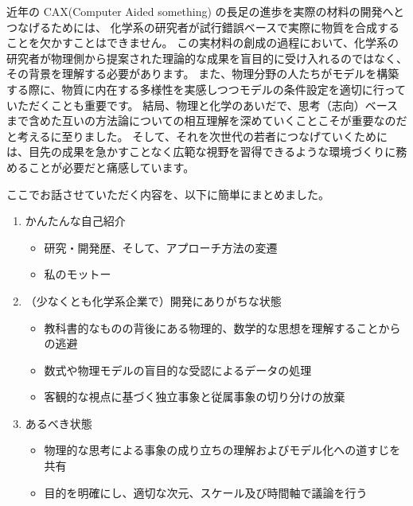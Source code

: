 \documentclass[uplatex,a4paper, 11pt]{jsarticle}
\begin{document}
近年の CAX(Computer Aided something) の長足の進歩を実際の材料の開発へとつなげるためには、
化学系の研究者が試行錯誤ベースで実際に物質を合成することを欠かすことはできません。
この実材料の創成の過程において、化学系の研究者が物理側から提案された理論的な成果を盲目的に受け入れるのではなく、
その背景を理解する必要があります。
また、物理分野の人たちがモデルを構築する際に、物質に内在する多様性を実感しつつモデルの条件設定を適切に行っていただくことも重要です。
結局、物理と化学のあいだで、思考（志向）ベースまで含めた互いの方法論についての相互理解を深めていくことこそが重要なのだと考えるに至りました。
そして、それを次世代の若者につなげていくためには、目先の成果を急かすことなく広範な視野を習得できるような環境づくりに務めることが必要だと痛感しています。
\vspace{3mm}
\begin{boxnote}
    \vspace{-1mm}
    ここでお話させていただく内容を、以下に簡単にまとめました。
    \vspace{-1mm}
\begin{enumerate}
    \item かんたんな自己紹介
    \begin{itemize}
        \item 研究・開発歴、そして、アプローチ方法の変遷
        \item 私のモットー
    \end{itemize}
    \item （少なくとも化学系企業で）開発にありがちな状態
    \begin{itemize}
        \item 教科書的なものの背後にある物理的、数学的な思想を理解することからの逃避
        \item 数式や物理モデルの盲目的な受認によるデータの処理
        \item 客観的な視点に基づく独立事象と従属事象の切り分けの放棄
    \end{itemize}
    \item あるべき状態
    \begin{itemize}
        \item 物理的な思考による事象の成り立ちの理解およびモデル化への道すじを共有
        \item 目的を明確にし、適切な次元、スケール及び時間軸で議論を行う

\end{itemize}
\end{enumerate}
\end{boxnote}
\end{document}
